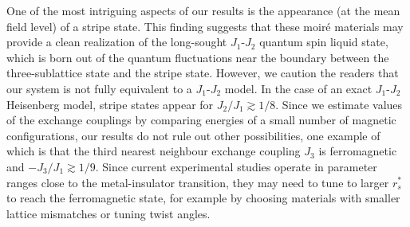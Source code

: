 \documentclass[%
 reprint,
 superscriptaddress,
 amsmath,amssymb,
 aps,
 prx,
 floatfix,
]{revtex4-2}
\newcommand{\<}{\langle}
\renewcommand{\>}{\rangle}
\renewcommand{\(}{\left(}
\renewcommand{\)}{\right)}
\renewcommand{\[}{\left[}
\renewcommand{\]}{\right]}
\begin{document}
One of the most intriguing aspects of our results is the appearance (at the mean field level) of a stripe state.
This finding suggests that these moir\'e materials may provide a clean realization of the long-sought $J_1$-$J_2$ quantum spin liquid state, 
which is born out of the quantum fluctuations near the boundary between the three-sublattice state and the stripe state. 
However, we caution the readers that our system is not fully equivalent to a $J_1$-$J_2$ model. 
In the case of an exact $J_1$-$J_2$ Heisenberg model, stripe states appear for $J_2/J_1\gtrsim 1/8$. 
Since we estimate values of the exchange couplings by comparing energies of a small number of magnetic configurations, 
our results do not rule out other possibilities, one example of which is that the third nearest neighbour exchange coupling $J_3$ is ferromagnetic and $-J_3/J_1\gtrsim1/9$. Since current experimental studies operate in parameter ranges 
close to the metal-insulator transition, they may need to tune to larger $r_s^*$ to reach the ferromagnetic state, 
for example by choosing materials with smaller lattice mismatches or tuning twist angles.
\end{document}
